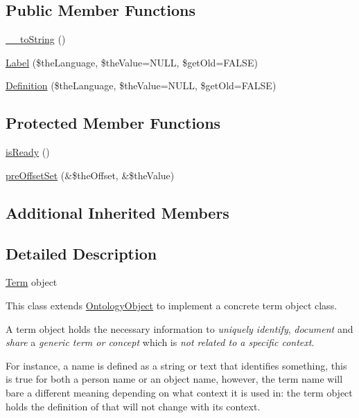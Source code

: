 \subsection*{Public Member Functions}
\begin{DoxyCompactItemize}
\item 
\hyperlink{class_ontology_wrapper_1_1_term_object_a31dc54e3b2e1993f347a15314c071c5a}{\-\_\-\-\_\-to\-String} ()
\item 
\hyperlink{class_ontology_wrapper_1_1_term_object_a05ed3e9fdc652aec61870fa60a2d84aa}{Label} (\$the\-Language, \$the\-Value=N\-U\-L\-L, \$get\-Old=F\-A\-L\-S\-E)
\item 
\hyperlink{class_ontology_wrapper_1_1_term_object_a4543137520876e089530b12abcc5836e}{Definition} (\$the\-Language, \$the\-Value=N\-U\-L\-L, \$get\-Old=F\-A\-L\-S\-E)
\end{DoxyCompactItemize}
\subsection*{Protected Member Functions}
\begin{DoxyCompactItemize}
\item 
\hyperlink{class_ontology_wrapper_1_1_term_object_a773ac006d05d898c54dd99ba7b25a727}{is\-Ready} ()
\item 
\hyperlink{class_ontology_wrapper_1_1_term_object_a0baeefb6b69973539ab8159895388922}{pre\-Offset\-Set} (\&\$the\-Offset, \&\$the\-Value)
\end{DoxyCompactItemize}
\subsection*{Additional Inherited Members}


\subsection{Detailed Description}
\hyperlink{class_ontology_wrapper_1_1_term}{Term} object

This class extends \hyperlink{class_ontology_wrapper_1_1_ontology_object}{Ontology\-Object} to implement a concrete term object class.

A term object holds the necessary information to {\itshape uniquely identify}, {\itshape document} and {\itshape share} a {\itshape generic term or concept} which is {\itshape not related to a specific context}.

For instance, a {\ttfamily name} is defined as a string or text that identifies something, this is true for both a person name or an object name, however, the term {\ttfamily name} will bare a different meaning depending on what context it is used in\-: the term object holds the definition of that will not change with its context.

